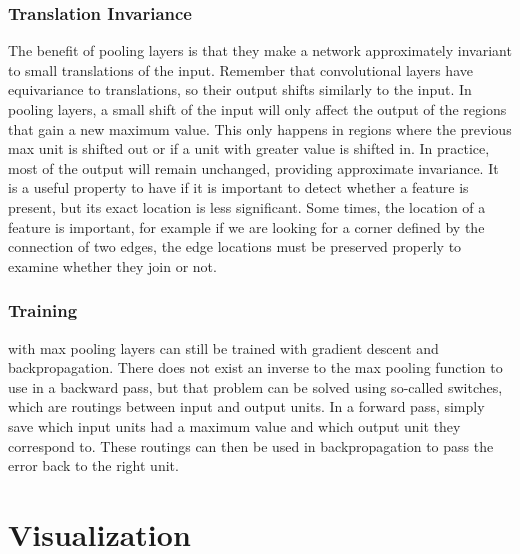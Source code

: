 \subsubsection{Translation Invariance}

The benefit of pooling layers is that they make a network approximately invariant to small translations of the input. Remember that convolutional layers have equivariance to translations, so their output shifts similarly to the input. In pooling layers, a small shift of the input will only affect the output of the regions that gain a new maximum value. This only happens in regions where the previous max unit is shifted out or if a unit with greater value is shifted in. In practice, most of the output will remain unchanged, providing approximate invariance. It is a useful property to have if it is important to detect whether a feature is present, but its exact location is less significant. Some times, the location of a feature is important, for example if we are looking for a corner defined by the connection of two edges, the edge locations must be preserved properly to examine whether they join or not.

\subsubsection{Training}

 with max pooling layers can still be trained with gradient descent and backpropagation. There does not exist an inverse to the max pooling function to use in a backward pass, but that problem can be solved using so-called switches, which are routings between input and output units. In a forward pass, simply save which input units had a maximum value and which output unit they correspond to. These routings can then be used in backpropagation to pass the error back to the right unit.

\section{Visualization} \label{sec:visualization-theory}

